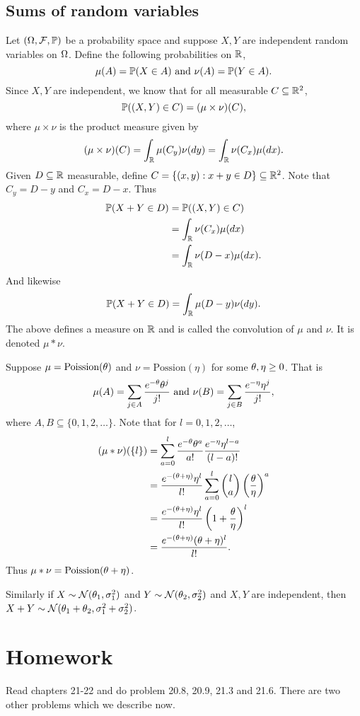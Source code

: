 \subsection{Sums of random variables}
Let $({{\Omega}},{\mathcal{F}},{\mathbb{P}})$ be a probability space and suppose $X,Y$ are independent random variables on ${{\Omega}}$. Define the following probabilities on ${\mathbb R}$,
\[\mu(A) = {\mathbb{P}}(X \in A) \text{ and } \nu(A) = {\mathbb{P}}(Y\in A). \]
Since $X,Y$ are independent, we know that for all measurable $C \subseteq {\mathbb R}^2$,
\[{\mathbb{P}}((X,Y) \in C) = (\mu \times \nu)(C), \]
where $\mu \times \nu$ is the product measure given by
\[(\mu \times \nu)(C) = \int_{\mathbb R} \mu(C_y)\nu(dy) = \int_{\mathbb R} \nu(C_x)\mu(dx). \]
Given $D \subseteq {\mathbb R}$ measurable, define $C = \{(x,y) : x+y \in D\} \subseteq {\mathbb R}^2$. Note that $C_y = D-y$ and $C_x = D-x$. Thus
\begin{align*}
    {\mathbb{P}}(X+Y \in D) &= {\mathbb{P}}((X,Y) \in C)\\
    &= \int_{\mathbb R} \nu(C_x)\mu(dx)\\
    &= \int_{\mathbb R} \nu(D-x)\mu(dx).
\end{align*}
And likewise
\[{\mathbb{P}}(X+Y \in D) = \int_{\mathbb R} \mu(D-y)\nu(dy). \]
The above defines a measure on ${\mathbb R}$ and is called the convolution of $\mu$ and $\nu$. It is denoted $\mu * \nu$.
\begin{ex}
    Suppose $\mu = \text{Poission}({\theta})$ and $\nu = \text{Possion}(\eta)$ for some ${\theta},\eta \ge 0$. That is\
    \[\mu(A) = \sum_{j \in A}\frac{e^{-{\theta}}{\theta}^j}{j!} \text{ and } \nu(B) = \sum_{j \in B} \frac{e^{-\eta}\eta^j}{j!},\]
    where $A,B \subseteq \{0,1,2,\ldots\}$. Note that for $l = 0,1,2,\ldots$,
    \begin{align*}
        (\mu *\nu)(\{l\}) &= \sum_{a=0}^l \frac{e^{-{\theta}}{\theta}^a}{a!}\frac{e^{-\eta}\eta^{l-a}}{(l-a)!}\\
        &= \frac{e^{-({\theta}+\eta)}\eta^l}{l!} \sum_{a=0}^l \binom{l}{a} \left(\frac{{\theta}}{\eta}\right)^a\\
        &=\frac{e^{-({\theta}+\eta)}\eta^l}{l!}\left(1+\frac{{\theta}}{\eta}\right)^l\\
        &=\frac{e^{-({\theta}+\eta)}({\theta}+\eta)^l}{l!}.
    \end{align*}
    Thus $\mu *\nu = \text{Poission}({\theta}+\eta)$.
\end{ex}
\begin{ex}
    Similarly if $X \sim {{\mathcal{N}}}({\theta}_1,\sigma^2_1)$ and $Y \sim {{\mathcal{N}}}({\theta}_2,\sigma^2_2)$ and $X,Y$ are independent, then $X+Y \sim {{\mathcal{N}}}({\theta}_1+{\theta}_2,\sigma_1^2+\sigma_2^2)$.
\end{ex}
\section{Homework}
Read chapters 21-22 and do problem 20.8, 20.9, 21.3 and 21.6. There are two other problems which we describe now.
